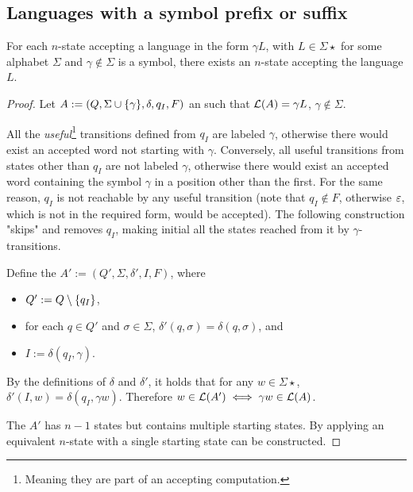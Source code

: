 \subsection{Languages with a symbol prefix or suffix}
\begin{thrm}
	For each $n$-state \NFA accepting a language in the form $\gamma L$, with $L\in\Sigma\star$ for some alphabet $\Sigma$ and $\gamma\notin\Sigma$ is a symbol, there exists an $n$-state \NFA accepting the language $L$.
\end{thrm}
\begin{proof}
	Let $A:=(Q,\Sigma\cup\{\gamma\},\delta,q_I,F)$ an \NFA such that $\mathcal L(A)=\gamma L$, $\gamma\notin\Sigma$.

	All the \emph{useful}\footnote{Meaning they are part of an accepting computation.} transitions defined from $q_I$ are labeled $\gamma$, otherwise there would exist an accepted word not starting with $\gamma$.
	Conversely, all useful transitions from states other than $q_I$ are not labeled $\gamma$, otherwise there would exist an accepted word containing the symbol $\gamma$ in a position other than the first.
	For the same reason, $q_I$ is not reachable by any useful transition (note that $q_I\notin F$, otherwise $\varepsilon$, which is not in the required form, would be accepted).
	The following construction "skips" and removes $q_I$, making initial all the states reached from it by $\gamma$-transitions.

	Define the \NFA $A':=(Q',\Sigma,\delta',I,F)$, where
	\begin{itemize}
		\item $Q':=Q\setminus\{q_I\}$,
		\item for each $q\in Q'$ and $\sigma\in\Sigma$, $\delta'(q,\sigma)=\delta(q,\sigma)$, and
		\item $I:=\delta(q_I,\gamma)$.
	\end{itemize}

	By the definitions of $\delta$ and $\delta'$, it holds that for any $w\in\Sigma\star$, $\delta'(I,w)=\delta(q_I,\gamma w)$.
	Therefore $w\in\mathcal L(A')\iff \gamma w\in\mathcal L(A)$.

	The \NFA $A'$ has $n-1$ states but contains multiple starting states. By applying  an equivalent $n$-state \NFA with a single starting state can be constructed.
\end{proof}


